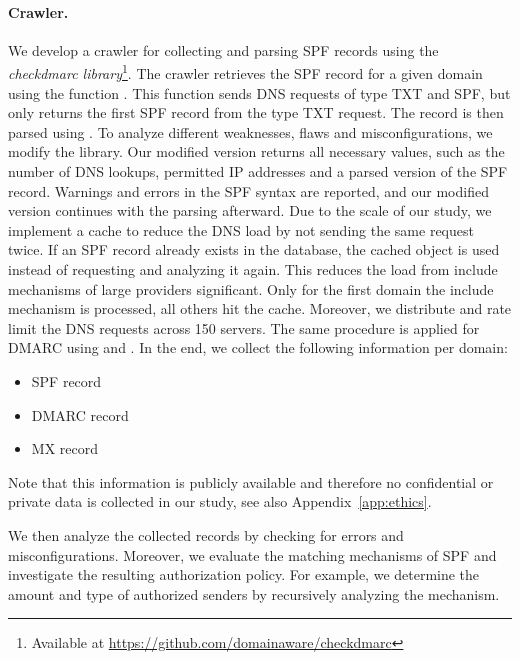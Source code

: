 \paragraph{Crawler.}
We develop a crawler for collecting and parsing SPF records using the \emph{checkdmarc library}\footnote{Available at \url{https://github.com/domainaware/checkdmarc}}.
The crawler retrieves the SPF record for a given domain using the function .
This function sends DNS requests of type TXT and SPF, but only returns the first SPF record from the type TXT request.
The record is then parsed using .
To analyze different weaknesses, flaws and misconfigurations, we modify the library.
Our modified version returns all necessary values, such as the number of DNS lookups, permitted IP addresses and a parsed version of the SPF record.
Warnings and errors in the SPF syntax are reported, and our modified version continues with the parsing afterward.
Due to the scale of our study, we implement a cache to reduce the DNS load by not sending the same request twice.
If an SPF record already exists in the database, the cached object is used instead of requesting and analyzing it again.
This reduces the load from include mechanisms of large providers significant.
Only for the first domain the include mechanism is processed, all others hit the cache. 
Moreover, we distribute and rate limit the DNS requests across 150 servers.
The same procedure is applied for \ac{DMARC} using  and .
In the end, we collect the following information per domain:
\begin{itemize}
	\item SPF record 
	\item DMARC record
	\item MX record 
\end{itemize}
Note that this information is publicly available and therefore no confidential or private data is collected in our study, see also Appendix~\ref{app:ethics}.

We then analyze the collected records by checking for errors and misconfigurations.
Moreover, we evaluate the matching mechanisms of \ac{SPF} and investigate the resulting authorization policy.
For example, we determine the amount and type of authorized senders by recursively analyzing the  mechanism.


